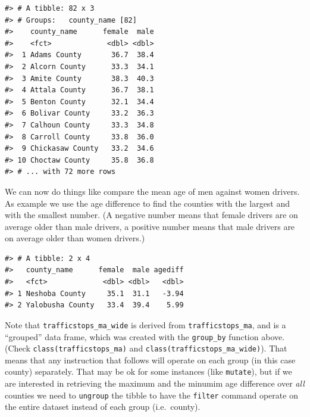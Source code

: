 \documentclass[]{book}
\newenvironment{Shaded}{\begin{snugshade}}{\end{snugshade}}
\newcommand{\DataTypeTok}[1]{\textcolor[rgb]{0.13,0.29,0.53}{#1}}
\newcommand{\KeywordTok}[1]{\textcolor[rgb]{0.13,0.29,0.53}{\textbf{#1}}}
\newcommand{\NormalTok}[1]{#1}
\newcommand{\OperatorTok}[1]{\textcolor[rgb]{0.81,0.36,0.00}{\textbf{#1}}}
\newcommand{\StringTok}[1]{\textcolor[rgb]{0.31,0.60,0.02}{#1}}
\begin{document}
\begin{verbatim}
#> # A tibble: 82 x 3
#> # Groups:   county_name [82]
#>    county_name      female  male
#>    <fct>             <dbl> <dbl>
#>  1 Adams County       36.7  38.4
#>  2 Alcorn County      33.3  34.1
#>  3 Amite County       38.3  40.3
#>  4 Attala County      36.7  38.1
#>  5 Benton County      32.1  34.4
#>  6 Bolivar County     33.2  36.3
#>  7 Calhoun County     33.3  34.8
#>  8 Carroll County     33.8  36.0
#>  9 Chickasaw County   33.2  34.6
#> 10 Choctaw County     35.8  36.8
#> # ... with 72 more rows
\end{verbatim}

We can now do things like compare the mean age of men against women drivers. As example we use the age difference to find the counties with the largest and with the smallest number. (A negative number means that female drivers are on average older than male drivers, a positive number means that male drivers are on average older than women drivers.)

\begin{Shaded}
\end{Shaded}

\begin{verbatim}
#> # A tibble: 2 x 4
#>   county_name      female  male agediff
#>   <fct>             <dbl> <dbl>   <dbl>
#> 1 Neshoba County     35.1  31.1   -3.94
#> 2 Yalobusha County   33.4  39.4    5.99
\end{verbatim}

Note that \texttt{trafficstops\_ma\_wide} is derived from \texttt{trafficstops\_ma}, and is a ``grouped'' data frame, which was created with the \texttt{group\_by} function above. (Check \texttt{class(trafficstops\_ma)} and \texttt{class(trafficstops\_ma\_wide)}). That means that any instruction that follows will operate on each group (in this case county) separately. That may be ok for some instances (like \texttt{mutate}), but if we are interested in retrieving the maximum and the minumim age difference over \emph{all} counties we need to \texttt{ungroup} the tibble to have the \texttt{filter} command operate on the entire dataset instead of each group (i.e.~county).
\end{document}
